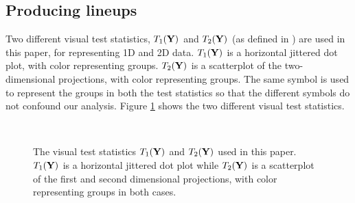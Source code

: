 \subsection{Producing lineups}

Two different visual test statistics, $T_1(\bf{Y})$ and $T_2(\bf{Y})$ (as defined in \cite{majumder:2011}) are used in this paper, for representing 1D and 2D data. $T_1(\bf{Y})$ is a horizontal jittered dot plot, with color representing groups. $T_2(\bf{Y})$ is a scatterplot of the two-dimensional projections, with color representing groups. The same symbol is used to represent the groups in both the test statistics so that the different symbols do not confound our analysis. Figure \ref{fig3} shows the two different visual test statistics.

\begin{figure}[htbp]
\centering
\mbox{\quad
{}}
\caption{The visual test statistics $T_1(\bf{Y})$ and $T_2(\bf{Y})$ used in this paper.  $T_1(\bf{Y})$ is a horizontal jittered dot plot while $T_2(\bf{Y})$ is a scatterplot of the first and second dimensional projections, with color representing groups in both cases. } 
\label{fig3}
\end{figure}

%
%
%
%

